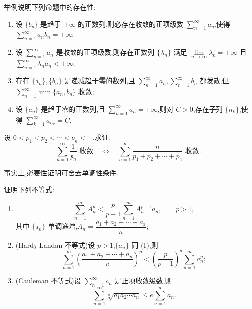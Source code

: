 \documentclass[../数学分析培优讲义.tex]{subfiles}
\begin{document}
\begin{example}[\markstar]
举例说明下列命题中的存在性:
\begin{enumerate}[label=(\arabic*)]
    \item 设 $\{b_n\}$ 是趋于 $+\infty$ 的正数列,则必存在收敛的正项级数 $\displaystyle\sum\limits_{n=1}^{\infty}a_n$,使得 $\displaystyle\sum\limits_{n=1}^{\infty}a_nb_n=+\infty$;
    \item 设 $\displaystyle\sum\limits_{n=1}^{\infty}a_n$ 是收敛的正项级数,则存在正数列 $\{\lambda_n\}$ 满足 $\displaystyle\lim\limits_{n\to\infty}\lambda_n=+\infty$ 且 $\displaystyle\sum\limits_{n=1}^{\infty}\lambda_na_n<+\infty$;
    \item 存在 $\{a_n\},\{b_n\}$ 是递减趋于零的数列,且 $\displaystyle\sum\limits_{n=1}^{\infty}a_n,\sum\limits_{n=1}^{\infty}b_n$ 都发散,但 $\displaystyle\sum\limits_{n=1}^{\infty}\min\{a_n,b_n\}$ 收敛;
    \item 设 $\{a_n\}$ 是趋于零的正数列,且 $\displaystyle\sum\limits_{n=1}^{\infty}a_n=+\infty$,则对 $C>0$,存在子列 $\{n_k\}$,使得 $\displaystyle\sum\limits_{k=1}^{\infty}a_{n_k}=C$.
\end{enumerate}
\end{example}
\exampleblank

\begin{example}
设 $0<p_1<p_2<\cdots<p_n<\cdots$,求证:
\[
    \sum\limits_{n=1}^{\infty}\dfrac{1}{p_n}\text{ 收敛}
    \quad\Longleftrightarrow\quad
    \sum\limits_{n=1}^{\infty}\dfrac{n}{p_1+p_2+\cdots+p_n}\text{ 收敛}.
\]
\end{example}
\exampleblank

\begin{remark}
事实上,必要性证明可舍去单调性条件.
\end{remark}

\begin{example}
证明下列不等式:
\begin{enumerate}[label=(\arabic*)]
    \item
    \[
        \sum\limits_{n=1}^m A_n^p
        <\dfrac{p}{p-1}\sum\limits_{n=1}^mA_n^{p-1}a_n,
        \qquad p>1,
    \]
    其中 $\{a_n\}$ 单调递增,$\displaystyle A_n=\dfrac{a_1+a_2+\cdots+a_n}{n}$;
    \item (Hardy-Landan 不等式)设 $p>1$,$\{a_n\}$ 同 (1),则
    \[
        \sum\limits_{n=1}^m\left(\dfrac{a_1+a_2+\cdots+a_n}{n}\right)^p
        <\left(\dfrac{p}{p-1}\right)^p\sum\limits_{n=1}^ma_n^p;
    \]
    \item (Cauleman 不等式)设 $\displaystyle\sum\limits_{n=1}^{\infty}a_n$ 是正项收敛级数,则
    \[
        \sum\limits_{n=1}^{\infty}\sqrt[n]{a_1a_2\cdots a_n}
        \leq e\sum\limits_{n=1}^{\infty}a_n.
    \]
\end{enumerate}
\end{example}
\exampleblank
\end{document}
